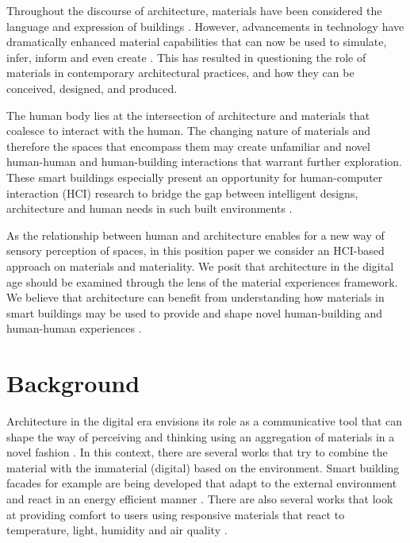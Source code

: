 \documentclass[manuscript, anonymous, review]{acmart}
\begin{document}
Throughout the discourse of architecture, materials have been considered the language and expression of buildings \cite{schropfer2012material}. However, advancements in technology have dramatically enhanced material capabilities that can now be used to simulate, infer, inform and even create \cite{schropfer2012material, kolarevic2004architecture}. This has resulted in questioning the role of materials in contemporary architectural practices, and how they can be conceived, designed, and produced. 

The human body lies at the intersection of architecture and materials that coalesce to interact with the human. The changing nature of materials and therefore the spaces that encompass them may create unfamiliar and novel human-human and human-building interactions that warrant further exploration. These smart buildings especially present an opportunity for human-computer interaction (HCI) research to bridge the gap between intelligent designs, architecture and human needs in such built environments \cite{nembrini2017human}.  

As the relationship between human and architecture enables for a new way of sensory perception of spaces, in this position paper we consider an HCI-based approach on materials and materiality. We posit that architecture in the digital age should be examined through the lens of the material experiences framework. We believe that architecture can benefit from understanding how materials in smart buildings may be used to provide and shape novel human-building and human-human experiences  \cite{giaccardi2015foundations, thomas2006material}. 



\section{Background}
Architecture in the digital era envisions its role as a communicative tool that can shape the way of perceiving and thinking using an aggregation of materials in a novel fashion \cite{kolarevic2001designing}. In this context, there are several works that try to combine the material with the immaterial (digital) based on the environment. Smart building facades for example are being developed that adapt to the external environment and react in an energy efficient manner \cite{ahmed2015development}. There are also several works that look at providing comfort to users using responsive materials that react to temperature, light, humidity and air quality \cite{fragkia2020exergy, holstov2015hygromorphic, kroner1997intelligent}. 
\end{document}

